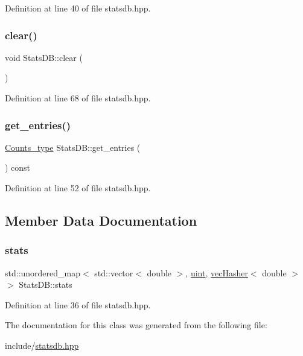 Definition at line 40 of file statsdb.\+hpp.

\mbox{\label{class_stats_d_b_a5de68def55b0a3b99a8f609815624a00}} 
\subsubsection{\texorpdfstring{clear()}{clear()}}
{\footnotesize\ttfamily void Stats\+D\+B\+::clear (\begin{DoxyParamCaption}{ }\end{DoxyParamCaption})\hspace{0.3cm}{\ttfamily [inline]}}



Definition at line 68 of file statsdb.\+hpp.

\mbox{\label{class_stats_d_b_a8ed62f6a3939b90b3493de944c9b67fc}} 
\subsubsection{\texorpdfstring{get\+\_\+entries()}{get\_entries()}}
{\footnotesize\ttfamily \hyperlink{typedefs_8hpp_aee40fa17c1fddb63dd1f2b1470ade95b}{Counts\+\_\+type} Stats\+D\+B\+::get\+\_\+entries (\begin{DoxyParamCaption}{ }\end{DoxyParamCaption}) const\hspace{0.3cm}{\ttfamily [inline]}}



Definition at line 52 of file statsdb.\+hpp.



\subsection{Member Data Documentation}
\mbox{\label{class_stats_d_b_a675ecc967115b14bf8693858920a4a6c}} 
\subsubsection{\texorpdfstring{stats}{stats}}
{\footnotesize\ttfamily std\+::unordered\+\_\+map$<$ std\+::vector$<$ double $>$, \hyperlink{typedefs_8hpp_a91ad9478d81a7aaf2593e8d9c3d06a14}{uint}, \hyperlink{structvec_hasher}{vec\+Hasher}$<$ double $>$ $>$ Stats\+D\+B\+::stats}



Definition at line 36 of file statsdb.\+hpp.



The documentation for this class was generated from the following file\+:\begin{DoxyCompactItemize}
\item 
include/\hyperlink{statsdb_8hpp}{statsdb.\+hpp}\end{DoxyCompactItemize}
